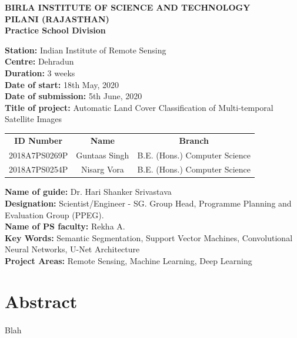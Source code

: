 \documentclass[12pt, a4paper]{report}
\begin{document}
\begin{center}  
\textbf {BIRLA INSTITUTE OF SCIENCE AND TECHNOLOGY\\
PILANI (RAJASTHAN)\\
Practice School Division}
\end{center}
\begin{onehalfspace}
\textbf{Station:} Indian Institute of Remote Sensing \\
\textbf{Centre:} Dehradun\\
\textbf{Duration:} 3 weeks\\
\textbf{Date of start:} 18th May, 2020 \\
\textbf{Date of submission:} 5th June, 2020 \\
\textbf{Title of project:} Automatic Land Cover Classification of Multi-temporal Satellite Images
\begin{center}
\begin{tabular}{c c c}
\textbf{ID Number} & \textbf{Name} & \textbf{Branch} \\
2018A7PS0269P & Guntaas Singh & B.E. (Hons.) Computer Science \\
2018A7PS0254P & Nisarg Vora  & B.E. (Hons.) Computer Science \\
\end{tabular} 
\end{center}
\textbf{Name of guide:} Dr. Hari Shanker Srivastava \\
\textbf{Designation:} Scientist/Engineer - SG. Group Head, Programme Planning and Evaluation Group (PPEG). \\
\textbf{Name of PS faculty:} Rekha A. \\
\textbf{Key Words:} Semantic Segmentation, Support Vector Machines, Convolutional Neural Networks, U-Net Architecture\\
\textbf{Project Areas:} Remote Sensing, Machine Learning, Deep Learning
\section{Abstract}
\paragraph{}
Blah
\end{onehalfspace}
\newpage
\end{document}
